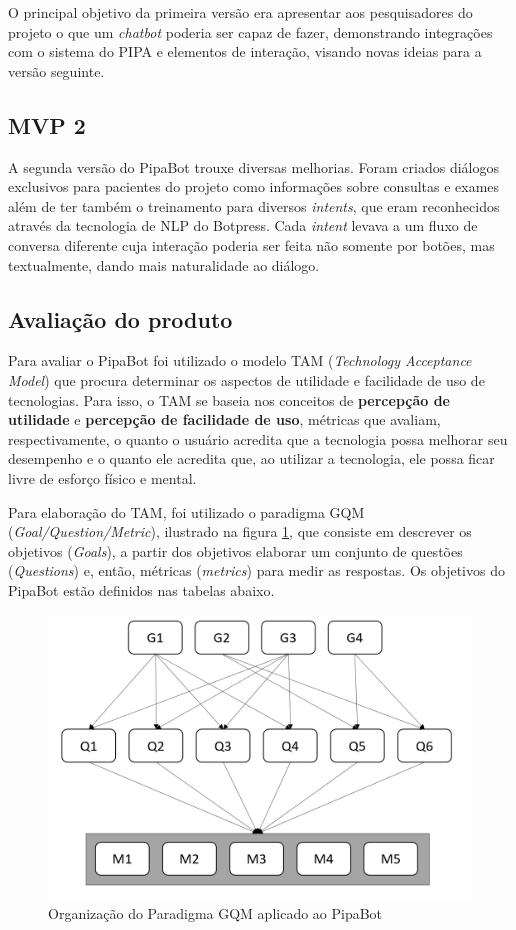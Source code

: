   O principal objetivo da primeira versão era apresentar aos pesquisadores do projeto o que um \textit{chatbot} poderia ser capaz de fazer, demonstrando integrações com o sistema do PIPA e elementos de interação, visando novas ideias para a versão seguinte.
  \subsection{MVP 2}
  A segunda versão do PipaBot trouxe diversas melhorias. Foram criados diálogos exclusivos para pacientes do projeto como informações sobre consultas e exames além de ter também o treinamento para diversos \textit{intents}, que eram reconhecidos através da tecnologia de NLP do Botpress. Cada \textit{intent} levava a um fluxo de conversa diferente cuja interação poderia ser feita não somente por botões, mas textualmente, dando mais naturalidade ao diálogo.
  \subsection{Avaliação do produto}
  Para avaliar o PipaBot foi utilizado o modelo TAM (\textit{Technology Acceptance Model})\cite{tam_davis} que procura determinar os aspectos de utilidade e facilidade de uso de tecnologias. Para isso, o TAM se baseia nos conceitos de \textbf{percepção de utilidade} e \textbf{percepção de facilidade de uso}, métricas que avaliam, respectivamente, o quanto o usuário acredita que a tecnologia possa melhorar seu desempenho e o quanto ele acredita que, ao utilizar a tecnologia, ele possa ficar livre de esforço físico e mental.
  
  Para elaboração do TAM, foi utilizado o paradigma GQM (\textit{Goal/Question/Metric}), ilustrado na figura \ref{fig:gqm}, que consiste em descrever os objetivos (\textit{Goals}), a partir dos objetivos elaborar um conjunto de questões (\textit{Questions}) e, então, métricas (\textit{metrics}) para medir as respostas. Os objetivos do PipaBot estão definidos nas tabelas abaixo.
  
  \begin{figure}[h!]
  	\begin{center}
  		\includegraphics[width=1\linewidth]{images/gqm.png}
  		\caption{Organização do Paradigma GQM aplicado ao PipaBot}
  		\label{fig:gqm}
  	\end{center}
  \end{figure}
  
